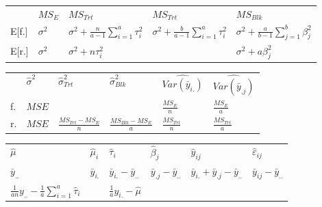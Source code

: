 \documentclass[10pt,portrait]{article}
\begin{document}
\begin{multicols}{2}
\begin{tabular}{l|l|l|l|l}
     &$MS_{E}$  & $MS_{Trt}$ & $MS_{Trt}$ & $MS_{Blk}$ \\
E[f.]&$\sigma^2$& $\sigma^2+\frac{n}{a-1}\sum_{i=1}^a\tau_i^2$& $\sigma^2+\frac{b}{a-1}\sum_{i=1}^a\tau_i^2$&$\sigma^2+\frac{a}{b-1}\sum_{j=1}^b\beta_j^2$\\
E[r.]&$\sigma^2$& $\sigma^2+n\tau_i^2$& & $\sigma^2+a\beta_j^2$\\
\hline
\end{tabular}

\begin{tabular}{l|l|l|l|l|l}
&$\hat\sigma^2$&$\hat\sigma_{Trt}^2$&$\hat\sigma_{Blk}^2$&$\widehat{Var(\bar y_{i.})}$&$\widehat{Var(\bar y_{.j})}$\\
f.&$MSE$& & &$\frac{MS_{E}}{n}$& $\frac{MS_{E}}{a}$\\
r.&$MSE$&$\frac{MS_{Trt}-MS_{E}}{n}$&$\frac{MS_{Blk}-MS_{E}}{a}$&$\frac{MS_{Trt}}{n}$&$\frac{MS_{Trt}}{a}$\\
\end{tabular}

\begin{tabular}{l|l|l|l|l|l}
$\hat\mu$&$\hat\mu_i$&$\hat\tau_i$&$\hat\beta_j$&$\hat y_{ij}$&$\hat\varepsilon_{ij}$\\
$\bar y_{..}$&$\bar y_{i.}$&$\bar y_{i.}-\bar y_{..}$&$\bar y_{.j}-\bar y_{..}$&$\bar y_{i.}+\bar y_{.j}-\bar y_{..}$&$\bar y_{ij}-\bar y_{..}$\\
$\frac1{an}y_{..}-\frac1{a}\sum_{i=1}^a\hat\tau_i$& & $\frac1{a}y_{i.}-\hat\mu$\\
\hline
\end{tabular}


\end{multicols}
\end{document}

